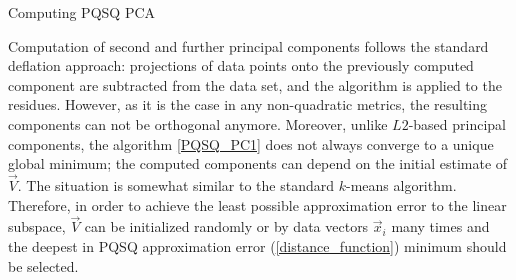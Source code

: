 \documentclass[preprint,12pt]{elsarticle}
\makeatletter
\def\BState{\State\hskip-\ALG@thistlm}
\makeatother
\begin{document}
\begin{algorithm}
\caption{Computing PQSQ PCA}\label{PQSQ_PC1}
\end{algorithm}

Computation of second and further principal components follows the standard deflation approach: projections of data points onto the previously computed component are subtracted from the data set, and the algorithm is applied to the residues. However, as it is the case in any non-quadratic metrics, the resulting components can not be orthogonal anymore. 
Moreover, unlike $L2$-based principal components, the algorithm \ref{PQSQ_PC1} does not always converge to a unique global minimum; the computed components can depend on the initial estimate of $\vec{V}$. The situation is somewhat similar to the standard $k$-means algorithm. Therefore, in order to achieve the least possible approximation error to the linear subspace, $\vec{V}$ can be initialized randomly or by data vectors $\vec{x}_i$ many times and the deepest in PQSQ approximation error (\ref{distance_function}) minimum should be selected.
\end{document}
